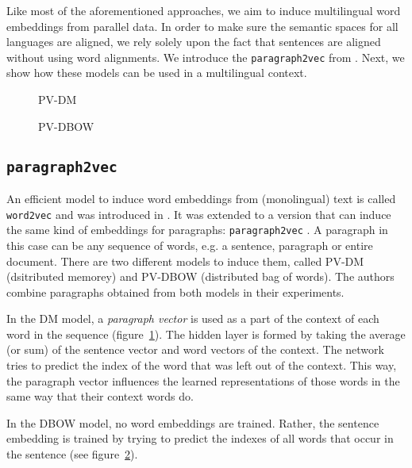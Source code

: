Like most of the aforementioned approaches, we aim to induce multilingual word embeddings from parallel data. In order to make sure the semantic spaces for all languages are aligned, we rely solely upon the fact that sentences are aligned without using word alignments.
We introduce the \texttt{paragraph2vec} from \cite{Le2014}. Next, we show how these models can be used in a multilingual context.

\begin{figure*}\center
\begin{subfigure}{.45\textwidth}\center

\caption{PV-DM}
\label{fig:p2v-DM}
\end{subfigure}
\begin{subfigure}{.45\textwidth}\center

\caption{PV-DBOW}
\label{fig:p2v-DBOW}
\end{subfigure}
\caption{\texttt{paragraph2vec} models}
\end{figure*}

\subsection{\texttt{paragraph2vec}}
An efficient model to induce word embeddings from (monolingual) text is called \texttt{word2vec}  and was introduced in \cite{mikolov2013efficient}. It was extended to a version that can induce the same kind of embeddings for paragraphs: \texttt{paragraph2vec} \cite{Le2014}. A paragraph in this case can be any sequence of words, e.g. a sentence, paragraph or entire document. There are two different models to induce them, called PV-DM (dsitributed memorey) and PV-DBOW (distributed bag of words). The authors combine paragraphs obtained from both models in their experiments.

In the DM model, a \emph{paragraph vector} is used as a part of the context of each word in the sequence (figure~\ref{fig:p2v-DM}).
The hidden layer is formed by taking the average (or sum) of the sentence vector and word vectors of the context. The network tries to predict the index of the word that was left out of the context.  
This way, the paragraph vector influences the learned representations of those words in the same way that their context words do.



In the DBOW model, no word embeddings are trained. Rather, the sentence embedding is trained by trying to predict the indexes of all words that occur in the sentence (see figure~\ref{fig:p2v-DBOW}).






